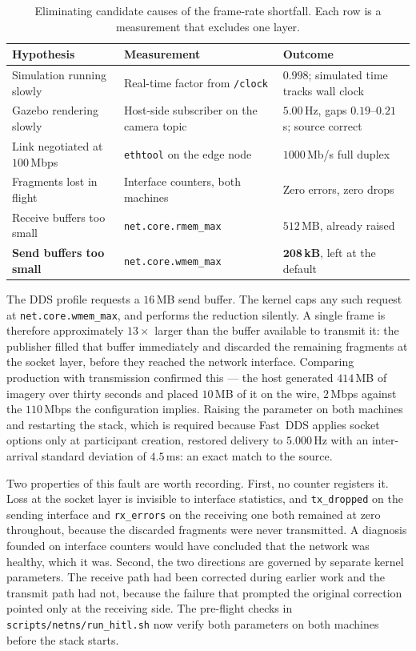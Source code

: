 \begin{table}[htbp]
\centering
\caption{Eliminating candidate causes of the frame-rate shortfall. Each row
is a measurement that excludes one layer.}
\label{tab:test-elimination}
\begin{tabular}{@{}p{38mm}p{38mm}p{40mm}@{}}
\toprule
Hypothesis & Measurement & Outcome \\
\midrule
Simulation running slowly
  & Real-time factor from \texttt{/clock}
  & \(0.998\); simulated time tracks wall clock \\[3pt]
Gazebo rendering slowly
  & Host-side subscriber on the camera topic
  & \(5.00\)\,Hz, gaps \(0.19\)--\(0.21\)\,s; source correct \\[3pt]
Link negotiated at $100$\,Mbps
  & \texttt{ethtool} on the edge node
  & $1000$\,Mb/s full duplex \\[3pt]
Fragments lost in flight
  & Interface counters, both machines
  & Zero errors, zero drops \\[3pt]
Receive buffers too small
  & \texttt{net.core.rmem\_max}
  & $512$\,MB, already raised \\[3pt]
\textbf{Send buffers too small}
  & \texttt{net.core.wmem\_max}
  & \(\mathbf{208}\)\,\textbf{kB}, left at the default \\
\bottomrule
\end{tabular}
\end{table}

The DDS profile requests a \(16\)\,MB send buffer. The kernel caps any such
request at \texttt{net.core.wmem\_max}, and performs the reduction silently.
A single frame is therefore approximately \(13\times\) larger than the
buffer available to transmit it: the publisher filled that buffer
immediately and discarded the remaining fragments at the socket layer,
before they reached the network interface. Comparing production with
transmission confirmed this --- the host generated \(414\)\,MB of imagery
over thirty seconds and placed \(10\)\,MB of it on the wire, \(2\)\,Mbps
against the \(110\)\,Mbps the configuration implies. Raising the parameter
on both machines and restarting the stack, which is required because
Fast~DDS applies socket options only at participant creation, restored
delivery to \(5.000\)\,Hz with an inter-arrival standard deviation of
\(4.5\)\,ms: an exact match to the source.

Two properties of this fault are worth recording. First, no counter
registers it. Loss at the socket layer is invisible to interface
statistics, and \texttt{tx\_dropped} on the sending interface and
\texttt{rx\_errors} on the receiving one both remained at zero throughout,
because the discarded fragments were never transmitted. A diagnosis founded
on interface counters would have concluded that the network was healthy,
which it was. Second, the two directions are governed by separate kernel
parameters. The receive path had been corrected during earlier work and the
transmit path had not, because the failure that prompted the original
correction pointed only at the receiving side. The pre-flight checks in
\texttt{scripts/netns/run\_hitl.sh} now verify both parameters on both
machines before the stack starts.

